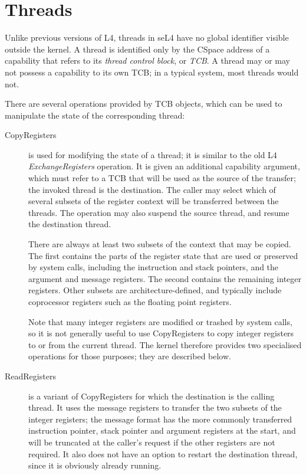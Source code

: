 \section{Threads}\label{sec:overview.threads}

Unlike previous versions of L4, threads in seL4 have no global identifier
visible outside the kernel. A thread is identified only by the CSpace address
of a capability that refers to its \emph{thread control block}, or \emph{TCB}.
A thread may or may not possess a capability to its own TCB; in a typical
system, most threads would not.

There are several operations provided by TCB objects, which can be used to
manipulate the state of the corresponding thread:

\begin{description}
\item [CopyRegisters] is used for modifying the state of a thread; it is similar to the old L4 \emph{ExchangeRegisters} operation. It is given an additional capability argument, which must refer to a TCB that will be used as the source of the transfer; the invoked thread is the destination. The caller may select which of several subsets of the register context will be transferred between the threads. The operation may also suspend the source thread, and resume the destination thread.

There are always at least two subsets of the context that may be copied. The first contains the parts of the register state that are used or preserved by system calls, including the instruction and stack pointers, and the argument and message registers. The second contains the remaining integer registers. Other subsets are architecture-defined, and typically include coprocessor registers such as the floating point registers.

Note that many integer registers are modified or trashed by system calls, so it is not generally useful to use CopyRegisters to copy integer registers to or from the current thread. The kernel therefore provides two specialised operations for those purposes; they are described below.

\item [ReadRegisters] is a variant of CopyRegisters for which the destination is the calling thread. It uses the message registers to transfer the two subsets of the integer registers; the message format has the more commonly transferred instruction pointer, stack pointer and argument registers at the start, and will be truncated at the caller's request if the other registers are not required. It also does not have an option to restart the destination thread, since it is obviously already running.


\end{description}
